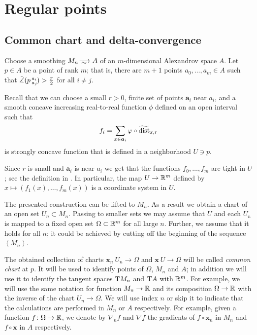 \section{Regular points}\label{sec:ref}

\subsection{Common chart and delta-convergence}

Choose a smoothing $M_n\smooths{} A$ of an $m$-dimensional Alexandrov space $A$.
Let $p\in A$ be a point of rank $m$; that is, there are $m+1$ points $a_0,\dots, a_m\in A$ such that 
$\tilde\measuredangle(p\,{}^{a_i}_{a_j}\hspace{-0.2ex})>\tfrac\pi2$ for all $i\ne j$.

Recall that we can choose a small $r>0$,
finite set of points $\bm{a}_i$ near $a_i$,
and a smooth concave increasing real-to-real function $\phi$ defined on an open interval such that 
\[f_i=\sum_{x\in \bm{a}_i}\varphi\circ\widetilde{\operatorname{\rm dist}}_{x,r}\]
is strongly concave function that is defined in a neighborhood $U\ni p$.

Since $r$ is small and $\bm{a}_i$ is near $a_i$ we get that the functions $f_0, \dots, f_m$ are tight in $U$; see the definition in \cite{petrunin-conc}.
In particular, the map $U\to\mathbb{R}^m$ defined by $x\mapsto (f_1(x),\dots,f_m(x))$ is a coordinate system in $U$.

The presented construction can be lifted to $M_n$.
As a result we obtain a chart of an open set $U_n\subset M_n$.
Passing to smaller sets we may assume that $U$ and each $U_n$ is mapped to a fixed open set $\Omega\subset\mathbb{R}^m$ for all large $n$.
Further, we assume that it holds for all $n$; it could be achieved by cutting off the beginning of the sequence $(M_n)$.

The obtained collection of charts $\bm{x}_n\:U_n\to \Omega$ and $\bm{x}\:U\to \Omega$ will be called \emph{common chart} at $p$.
It will be used to identify points of $\Omega$, $M_n$ and $A$; 
in addition we will use it to identify the tangent spaces $\mathrm{T} M_n$ and $\mathrm{T} A$ with $\mathbb{R}^m$.
For example, we will use the same notation for function $M_n\to \mathbb{R}$ and its composition $\Omega\to \mathbb{R}$ with the inverse of the chart $U_n\to \Omega$.
We will use index $n$ or skip it to indicate that the calculations are performed in $M_n$ or $A$ respectively.
For example, given a function $f\colon\Omega\to \mathbb{R}$, we denote by $\nabla_nf$ and $\nabla f$ the gradients of $f\circ \bm{x}_n$ in $M_n$ and $f\circ \bm{x}$ in $A$ respectively.

